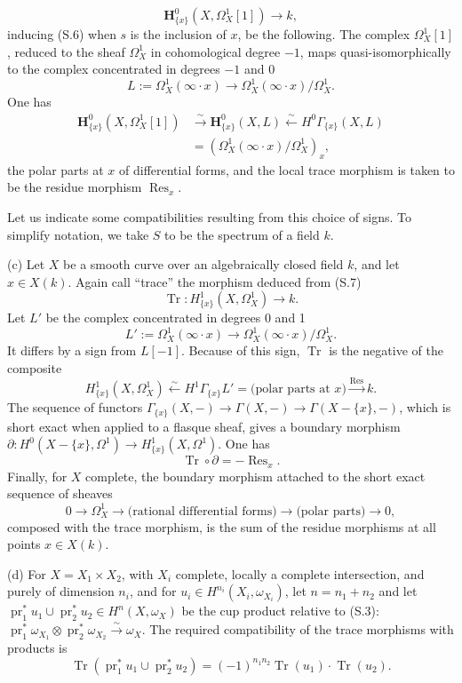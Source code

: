 \documentclass[11pt,leqno]{article}
\DeclareMathOperator{\Res}{Res}
\DeclareMathOperator{\Tr}{Tr}
\begin{document}
\begin{equation}
        \mathbf H^0_{\{x\}}(X,\Omega^1_X[1])\longrightarrow k, \tag{S.7}
\end{equation}
inducing (S.6) when $s$ is the inclusion of $x$, be the following. The complex $\Omega^1_X[1]$, reduced to the sheaf $\Omega^1_X$ in cohomological degree $-1$, maps quasi-isomorphically to the complex concentrated in degrees $-1$ and 0
\[
        L:=\Omega^1_X(\infty\cdot x)\longrightarrow\Omega^1_X(\infty\cdot x)/\Omega^1_X.
\]
One has
\[
\begin{aligned}
\mathbf H^0_{\{x\}}(X,\Omega^1_X[1])&\xrightarrow{\sim}\mathbf H^0_{\{x\}}(X,L)
\xleftarrow{\sim}H^0\Gamma_{\{x\}}(X,L)\\
&=(\Omega^1_X(\infty\cdot x)/\Omega^1_X)_x,
\end{aligned}
\]
the polar parts at $x$ of differential forms, and the local trace morphism is taken to be the residue morphism $\Res_x$.

Let us indicate some compatibilities resulting from this choice of signs. To simplify notation, we take $S$ to be the spectrum of a field $k$.

\noindent (c) Let $X$ be a smooth curve over an algebraically closed field $k$, and let $x\in X(k)$. Again call ``trace'' the morphism deduced from (S.7)
\[
        \Tr:H^1_{\{x\}}(X,\Omega^1_X)\longrightarrow k.
\]
Let $L'$ be the complex concentrated in degrees 0 and 1
\[
        L':=\Omega^1_X(\infty\cdot x)\longrightarrow\Omega^1_X(\infty\cdot x)/\Omega^1_X.
\]
It differs by a sign from $L[-1]$. Because of this sign, $\Tr$ is the negative of the composite
\[
        H^1_{\{x\}}(X,\Omega^1_X)\xleftarrow{\sim}H^1\Gamma_{\{x\}}L'
        =\text{(polar parts at }x)\xrightarrow{\Res}k.
\]
\clearpage
The sequence of functors $\Gamma_{\{x\}}(X,-)\to\Gamma(X,-)\to\Gamma(X-\{x\},-)$, which is short exact when applied to a flasque sheaf, gives a boundary morphism $\partial:H^0(X-\{x\},\Omega^1)\to H^1_{\{x\}}(X,\Omega^1)$. One has
\[
        \Tr\circ\partial=-\Res_x.
\]
Finally, for $X$ complete, the boundary morphism attached to the short exact sequence of sheaves
\[
        0\longrightarrow\Omega^1_X\longrightarrow\text{(rational differential forms)}
        \longrightarrow\text{(polar parts)}\longrightarrow0,
\]
composed with the trace morphism, is the sum of the residue morphisms at all points $x\in X(k)$.

\noindent (d) For $X=X_1\times X_2$, with $X_i$ complete, locally a complete intersection, and purely of dimension $n_i$, and for $u_i\in H^{n_i}(X_i,\omega_{X_i})$, let $n=n_1+n_2$ and let $\operatorname{pr}_1^*u_1\cup\operatorname{pr}_2^*u_2\in H^n(X,\omega_X)$ be the cup product relative to (S.3): $\operatorname{pr}_1^*\omega_{X_1}\otimes\operatorname{pr}_2^*\omega_{X_2}\xrightarrow{\sim}\omega_X$. The required compatibility of the trace morphisms with products is
\[
        \Tr(\operatorname{pr}_1^*u_1\cup\operatorname{pr}_2^*u_2)
        =(-1)^{n_1n_2}\Tr(u_1)\cdot\Tr(u_2).
\]
\end{document}
